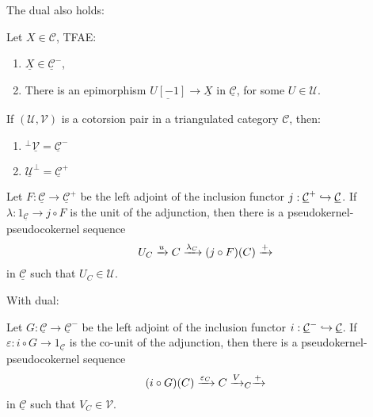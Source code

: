 The dual also holds:

\begin{lemma}
  Let $X\in\mathcal{C}$, TFAE:
  \begin{enumerate}
    \item $\underline{X} \in \underline{\mathcal{C}}^-$,
    \item There is an epimorphism $\underline{U[-1]}\to \underline{X}$ in
    $\underline{\mathcal{C}}$, for some $U\in\mathcal{U}$.
  \end{enumerate}
\end{lemma}

\begin{corollary}
  If $(\mathcal{U},\mathcal{V})$ is a cotorsion pair in a triangulated category
  $\mathcal{C}$, then:
  \begin{enumerate}
    \item $^\perp\underline{\mathcal{V}} = \underline{\mathcal{C}}^-$
    \item $\underline{\mathcal{U}}^\perp = \underline{\mathcal{C}}^+$
  \end{enumerate}
\end{corollary}

\begin{lemma}\label{sec1:lem2}
  Let $F:\underline{\mathcal{C}}\to\underline{\mathcal{C}}^+$ be the left adjoint
  of the inclusion functor $j:\underline{\mathcal{C}}^+ \hookrightarrow \underline{\mathcal{C}}$.
  If $\lambda:1_{\underline{\mathcal{C}}} \to j\circ F$ is the unit of the adjunction, then there is a pseudokernel-pseudocokernel
  sequence
  \begin{equation*}
    U_C\xrightarrow{u}C\xrightarrow{\lambda_{C}}(j\circ F)(C)\xrightarrow{+}
  \end{equation*}
  in $\underline{\mathcal{C}}$ such that $U_C\in \mathcal{U}$.
\end{lemma}

With dual:

\begin{lemma}
  Let $G:\underline{\mathcal{C}}\to\underline{\mathcal{C}}^-$ be the left adjoint
  of the inclusion functor $i:\underline{\mathcal{C}}^-\hookrightarrow \underline{\mathcal{C}}$.
  If $\varepsilon:i\circ G \to 1_{\underline{\mathcal{C}}}$ is the co-unit of the adjunction, then there is a pseudokernel-pseudocokernel
  sequence
  \begin{equation*}
    (i\circ G)(C) \xrightarrow{\varepsilon_{C}} C\xrightarrow{V}_C \xrightarrow{+}
  \end{equation*}
  in $\underline{\mathcal{C}}$ such that $V_C\in \mathcal{V}$.
\end{lemma}


